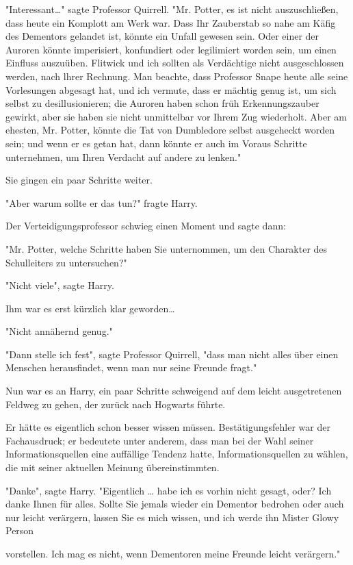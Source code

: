 {"Interessant…" sagte Professor Quirrell. "Mr. Potter, es ist nicht auszuschließen, dass heute ein Komplott am Werk war. Dass Ihr Zauberstab so nahe am Käfig des Dementors gelandet ist, könnte ein Unfall gewesen sein. Oder einer der Auroren könnte imperisiert, konfundiert oder legilimiert worden sein, um einen Einfluss auszuüben. Flitwick und ich sollten als Verdächtige nicht ausgeschlossen werden, nach lhrer Rechnung. Man beachte, dass Professor Snape heute alle seine Vorlesungen abgesagt hat, und ich vermute, dass er mächtig genug ist, um sich selbst zu desillusionieren; die Auroren haben schon früh Erkennungszauber gewirkt, aber sie haben sie nicht unmittelbar vor Ihrem Zug wiederholt. Aber am ehesten, Mr. Potter, könnte die Tat von Dumbledore selbst ausgeheckt worden sein; und wenn er es getan hat, dann könnte er auch im Voraus Schritte unternehmen, um Ihren Verdacht auf andere zu lenken."

Sie gingen ein paar Schritte weiter.

"Aber warum sollte er das tun?" fragte Harry.

Der Verteidigungsprofessor schwieg einen Moment und sagte dann:

"Mr. Potter, welche Schritte haben Sie unternommen, um den Charakter des Schulleiters zu untersuchen?"

"Nicht viele", sagte Harry.

Ihm war es erst kürzlich klar geworden…

"Nicht annähernd genug."

"Dann stelle ich fest", sagte Professor Quirrell, "dass man nicht alles über einen Menschen herausfindet, wenn man nur seine Freunde fragt."

Nun war es an Harry, ein paar Schritte schweigend auf dem leicht ausgetretenen Feldweg zu gehen, der zurück nach Hogwarts führte.

Er hätte es eigentlich schon besser wissen müssen. Bestätigungsfehler war der Fachausdruck; er bedeutete unter anderem, dass man bei der Wahl seiner Informationsquellen eine auffällige Tendenz hatte, Informationsquellen zu wählen, die mit seiner aktuellen Meinung übereinstimmten.

"Danke", sagte Harry. "Eigentlich … habe ich es vorhin nicht gesagt, oder? Ich danke Ihnen für alles. Sollte Sie jemals wieder ein Dementor bedrohen oder auch nur leicht verärgern, lassen Sie es mich wissen, und ich werde ihn Mister Glowy Person

vorstellen. Ich mag es nicht, wenn Dementoren meine Freunde leicht verärgern."

}
